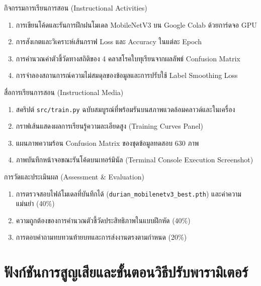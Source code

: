 \begin{planbox}{กิจกรรมการเรียนการสอน (Instructional Activities)}
\begin{enumerate}[leftmargin=1.5em, itemsep=2pt]
    \item การเขียนโค้ดและรันการฝึกฝนโมเดล MobileNetV3 บน Google Colab ด้วยการ์ดจอ GPU
    \item การสังเกตและวิเคราะห์เส้นกราฟ Loss และ Accuracy ในแต่ละ Epoch
    \item การคำนวณค่าตัวชี้วัดทางสถิติของ 4 คลาสโรคใบทุเรียนจากผลลัพธ์ Confusion Matrix
    \item การจำลองสถานการณ์ความไม่สมดุลของข้อมูลและการปรับใช้ Label Smoothing Loss
\end{enumerate}
\end{planbox}

\begin{planbox}{สื่อการเรียนการสอน (Instructional Media)}
\begin{enumerate}[leftmargin=1.5em, itemsep=2pt]
    \item สคริปต์ \texttt{src/train.py} ฉบับสมบูรณ์ที่พร้อมรันบนสภาพแวดล้อมคลาวด์และในเครื่อง
    \item กราฟเส้นแสดงผลการเรียนรู้ความละเอียดสูง (Training Curves Panel)
    \item แผนภาพความร้อน Confusion Matrix ของชุดข้อมูลทดสอบ 630 ภาพ
    \item ภาพบันทึกหน้าจอขณะรันโค้ดบนเทอร์มินัล (Terminal Console Execution Screenshot)
\end{enumerate}
\end{planbox}

\begin{planbox}{การวัดและประเมินผล (Assessment \& Evaluation)}
\begin{enumerate}[leftmargin=1.5em, itemsep=2pt]
    \item การตรวจสอบไฟล์โมเดลที่บันทึกได้ (\texttt{durian\_mobilenetv3\_best.pth}) และค่าความแม่นยำ (40\%)
    \item ความถูกต้องของการคำนวณตัวชี้วัดประสิทธิภาพในแบบฝึกหัด (40\%)
    \item การตอบคำถามทบทวนท้ายบทและการส่งงานตรงตามกำหนด (20\%)
\end{enumerate}
\end{planbox}

\clearpage

\section{ฟังก์ชันการสูญเสียและขั้นตอนวิธีปรับพารามิเตอร์}

